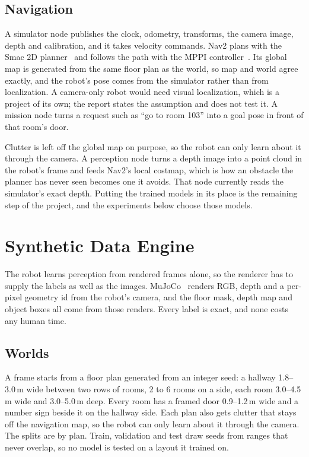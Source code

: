 \documentclass[conference]{IEEEtran}
\begin{document}
\subsection{Navigation}

A simulator node publishes the clock, odometry, transforms, the camera image,
depth and calibration, and it takes velocity commands. Nav2 plans with the
Smac 2D planner~\cite{macenski2024smac} and follows the path with the MPPI
controller~\cite{williams2018mppi}. Its global map is generated from the same
floor plan as the world, so map and world agree exactly, and the robot's pose
comes from the simulator rather than from localization. A camera-only robot
would need visual localization, which is a project of its own; the report
states the assumption and does not test it. A mission node turns a request
such as ``go to room 103'' into a goal pose in front of that room's door.

Clutter is left off the global map on purpose, so the robot can only learn
about it through the camera. A perception node turns a depth image into a
point cloud in the robot's frame and feeds Nav2's local costmap, which is
how an obstacle the planner has never seen becomes one it avoids. That node
currently reads the simulator's exact depth. Putting the trained models in its
place is the remaining step of the project, and the experiments below choose
those models.

\section{Synthetic Data Engine}
\label{sec:data}

The robot learns perception from rendered frames alone, so the renderer has
to supply the labels as well as the images. MuJoCo~\cite{todorov2012mujoco}
renders RGB, depth and a per-pixel geometry id from the robot's camera, and
the floor mask, depth map and object boxes all come from those renders. Every
label is exact, and none costs any human time.

\subsection{Worlds}

A frame starts from a floor plan generated from an integer seed: a hallway
1.8--3.0\,m wide between two rows of rooms, 2 to 6 rooms on a side, each room
3.0--4.5\,m wide and 3.0--5.0\,m deep. Every room has a framed door
0.9--1.2\,m wide and a number sign beside it on the hallway side. Each plan
also gets clutter that stays off the navigation map, so the robot can only
learn about it through the camera. The splits are by plan. Train, validation
and test draw seeds from ranges that never overlap, so no model is tested on
a layout it trained on.
\end{document}

